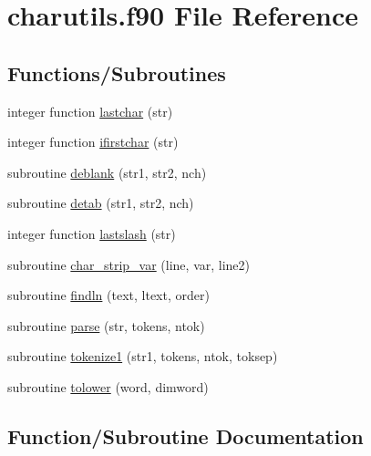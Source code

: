 \hypertarget{charutils_8f90}{}\section{charutils.\+f90 File Reference}
\label{charutils_8f90}
\subsection*{Functions/\+Subroutines}
\begin{DoxyCompactItemize}
\item 
integer function \hyperlink{charutils_8f90_a87970b69be4fb4bc3a18d6494928ffd7}{lastchar} (str)
\item 
integer function \hyperlink{charutils_8f90_a77d86dbb6e1b84eb3d65ca2810dc4c83}{ifirstchar} (str)
\item 
subroutine \hyperlink{charutils_8f90_ae6acc7e2374eb737e74a4edf85c3f1c2}{deblank} (str1, str2, nch)
\item 
subroutine \hyperlink{charutils_8f90_a3bed35f0ef06f900852da004a901ceaa}{detab} (str1, str2, nch)
\item 
integer function \hyperlink{charutils_8f90_a5e6b358f2c83a143003b006a530e8f3b}{lastslash} (str)
\item 
subroutine \hyperlink{charutils_8f90_aafbf897239b3e7ece2b4b8c7f050546a}{char\+\_\+strip\+\_\+var} (line, var, line2)
\item 
subroutine \hyperlink{charutils_8f90_a8157b2c97c7e594d512866e2e9f6e947}{findln} (text, ltext, order)
\item 
subroutine \hyperlink{charutils_8f90_a386868af54eb7d95d214363b9132230f}{parse} (str, tokens, ntok)
\item 
subroutine \hyperlink{charutils_8f90_a4e0b5a3a2a3a429434a954e8af39d758}{tokenize1} (str1, tokens, ntok, toksep)
\item 
subroutine \hyperlink{charutils_8f90_a2bd99695e205166c38b103139c05d3cf}{tolower} (word, dimword)
\end{DoxyCompactItemize}


\subsection{Function/\+Subroutine Documentation}
